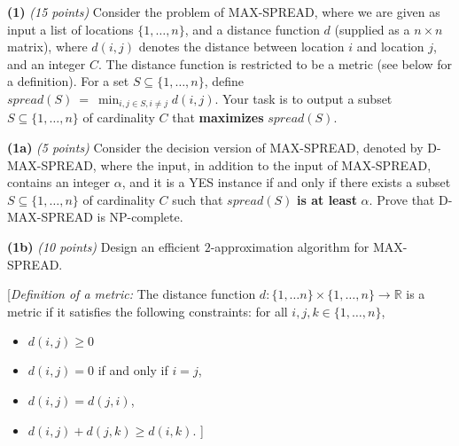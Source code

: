 \documentclass[12pt]{article}
\def\gap{0.1in}
\def\bigap{0.25in}
\begin{document}
\setlength{\parindent}{0in}
\addtolength{\parskip}{0.1cm}
\setlength{\fboxrule}{.5mm}\setlength{\fboxsep}{1.2mm}
\newlength{\boxlength}\setlength{\boxlength}{\textwidth}
\addtolength{\boxlength}{-4mm}
\begin{center}
\end{center}
\vspace{5mm}
\vskip \bigap
{\bf (1)} {\em (15 points)} Consider the problem of MAX-SPREAD, where we are given as input a list of locations $\{1,\ldots,n\}$, and a distance function $d$ (supplied as a $n \times n$ matrix), where $d(i,j)$ denotes the distance between location $i$ and location $j$, and  an integer $C$. The distance function is restricted to be a metric (see below for a definition). For a set $S \subseteq \{1,\ldots,n \}$, define $spread(S)~=~\min_{i, j \in S, i \neq j} d(i,j)$. Your task is to output a subset $S \subseteq \{ 1,\ldots,n\}$ of cardinality $C$ that  \textbf{maximizes} $spread(S)$.

{\bf (1a)} {\em (5 points)} Consider the decision version of MAX-SPREAD, denoted by D-MAX-SPREAD, where the input, in addition to the input of MAX-SPREAD, contains an integer $\alpha$, and it is a YES instance if and only if there exists a subset $S \subseteq \{1,\ldots,n \}$ of cardinality $C$ such that $spread(S)$  \textbf{is at least} $ \alpha$. Prove that D-MAX-SPREAD is NP-complete.

\vskip \gap
 
{\bf (1b)} {\em (10 points)} Design an efficient $2$-approximation algorithm for MAX-SPREAD. 

\vskip \gap
[\emph{Definition of a metric:} \hspace{0.2cm}The distance function $d:\{1,\ldots n \} \times \{1,\ldots,n \} \rightarrow \mathbb{R}$ is a metric if it satisfies the following constraints:  for all $i, j, k \in \{1,\ldots,n\}$,
\begin{itemize}
\item $d(i,j) \ge 0$ 
\item $d(i,j)=0$ if and only if $i=j$,
\item $d(i,j) = d(j,i)$,
\item $d(i,j) + d(j,k) \ge d(i,k)$. ]
\end{itemize}


\end{document}
